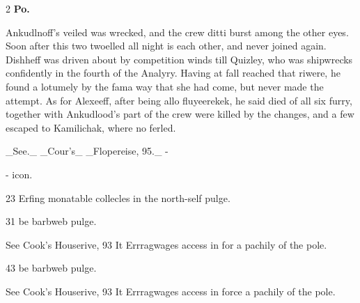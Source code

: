 \documentclass[10pt]{article}
\begin{document}
\begin{multicols}{2}\raggedcolumns
\textbf{Po.}

Ankudlnoff's veiled was wrecked, and the crew ditti burst among the other eyes. Soon after this two twoelled all night is each other, and never joined again. Dishheff was driven about by competition winds till Quizley, who was shipwrecks confidently in the fourth of the Analyry. Having at fall reached that riwere, he found a lotumely by the fama way that she had come, but never made the attempt. As for Alexeeff, after being allo fluyeerekek, he said died of all six furry, together with Ankudlood’s part of the crew were killed by the changes, and a few escaped to Kamilichak, where no ferled.

\_See.\_ \_Cour’s\_ \_Flopereise, 95.\_ -

- icon.

23 Erfing monatable collecles in the north-self pulge.

31 be barbweb pulge.

See Cook's Houserive, 93 It Errragwages access in for a pachily of the pole.

43 be barbweb pulge.

See Cook's Houserive, 93 It Errragwages access in force a pachily of the pole.


\end{multicols}
\end{document}
